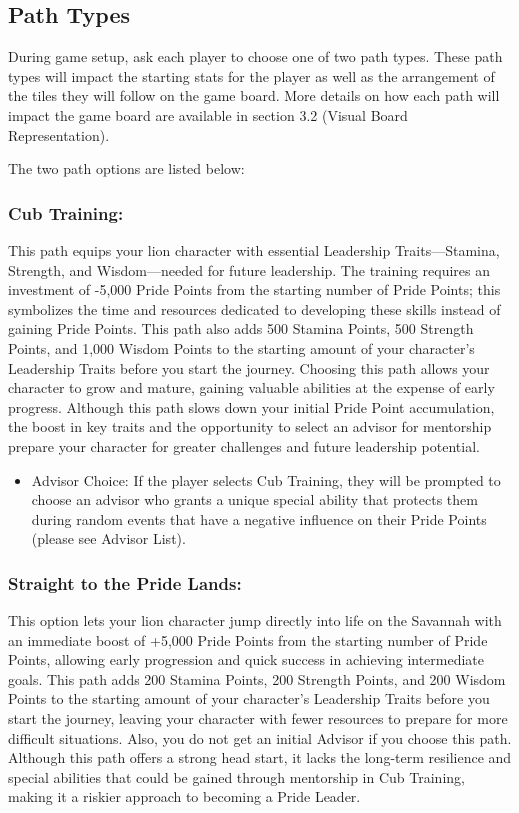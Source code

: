 \subsection{Path Types}
During game setup, ask each player to choose one of two path types. These path types will impact the starting stats for the player as well as the arrangement of the tiles they will follow on the game board. More details on how each path will impact the game board are available in section 3.2 (Visual Board Representation). 

The two path options are listed below:

\subsubsection{Cub Training:} 

This path equips your lion character with essential Leadership Traits—Stamina, Strength, and Wisdom—needed for future leadership. The training requires an investment of -5,000 Pride Points from the starting number of Pride Points; this symbolizes the time and resources dedicated to developing these skills instead of gaining Pride Points. This path also adds 500 Stamina Points, 500 Strength Points, and 1,000 Wisdom Points to the starting amount of your character's Leadership Traits before you start the journey. Choosing this path allows your character to grow and mature, gaining valuable abilities at the expense of early progress. Although this path slows down your initial Pride Point accumulation, the boost in key traits and the opportunity to select an advisor for mentorship prepare your character for greater challenges and future leadership potential. 
\begin{itemize}
    \item Advisor Choice: If the player selects Cub Training, they will be prompted to choose an advisor who grants a unique special ability that protects them during random events that have a negative influence on their Pride Points (please see Advisor List).
\end{itemize}

\subsubsection{Straight to the Pride Lands:} This option lets your lion character jump directly into life on the Savannah with an immediate boost of +5,000 Pride Points from the starting number of Pride Points, allowing early progression and quick success in achieving intermediate goals. This path adds 200 Stamina Points, 200 Strength Points, and 200 Wisdom Points to the starting amount of your character's Leadership Traits before you start the journey, leaving your character with fewer resources to prepare for more difficult situations. Also, you do not get an initial Advisor if you choose this path. Although this path offers a strong head start, it lacks the long-term resilience and special abilities that could be gained through mentorship in Cub Training, making it a riskier approach to becoming a Pride Leader. 


